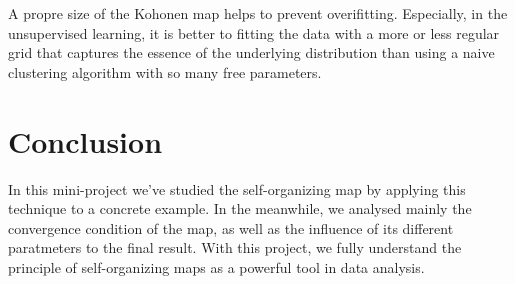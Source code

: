 \documentclass[a4paper, 12pt]{article}
\begin{document}
A propre size of the Kohonen map helps to prevent overifitting. Especially, in the unsupervised learning, it is better to fitting the data with a more or less regular grid that captures the essence of the underlying distribution than using a naive clustering algorithm with so many free parameters.

\section{Conclusion}

In this mini-project we've studied the self-organizing map by applying
this technique to a concrete example. In the meanwhile, we analysed
mainly the convergence condition of the map, as well as the influence of its
different paratmeters to the final result. With this project, we fully
understand the principle of self-organizing maps as a powerful tool in
data analysis.
\end{document}
